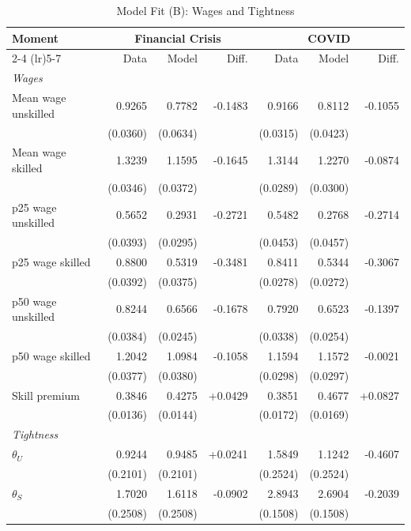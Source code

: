 \begin{table}[htbp]
  \centering
  \caption{Model Fit (B): Wages and Tightness}
  \label{tab:model_fit_b}
  \small
  \begin{tabular}{lrrrrrr}
    \toprule
    Moment & \multicolumn{3}{c}{Financial Crisis} & \multicolumn{3}{c}{COVID} \\
    \cmidrule(lr){2-4} \cmidrule(lr){5-7}
     & Data & Model & Diff. & Data & Model & Diff. \\
    \midrule
    \multicolumn{7}{l}{\textit{Wages}} \\[2pt]
    \quad Mean wage unskilled & 0.9265 & 0.7782 & -0.1483 & 0.9166 & 0.8112 & -0.1055 \\
     & {\scriptsize (0.0360)} & {\scriptsize (0.0634)} & & {\scriptsize (0.0315)} & {\scriptsize (0.0423)} & \\
    \quad Mean wage skilled & 1.3239 & 1.1595 & -0.1645 & 1.3144 & 1.2270 & -0.0874 \\
     & {\scriptsize (0.0346)} & {\scriptsize (0.0372)} & & {\scriptsize (0.0289)} & {\scriptsize (0.0300)} & \\
    \quad p25 wage unskilled & 0.5652 & 0.2931 & -0.2721 & 0.5482 & 0.2768 & -0.2714 \\
     & {\scriptsize (0.0393)} & {\scriptsize (0.0295)} & & {\scriptsize (0.0453)} & {\scriptsize (0.0457)} & \\
    \quad p25 wage skilled & 0.8800 & 0.5319 & -0.3481 & 0.8411 & 0.5344 & -0.3067 \\
     & {\scriptsize (0.0392)} & {\scriptsize (0.0375)} & & {\scriptsize (0.0278)} & {\scriptsize (0.0272)} & \\
    \quad p50 wage unskilled & 0.8244 & 0.6566 & -0.1678 & 0.7920 & 0.6523 & -0.1397 \\
     & {\scriptsize (0.0384)} & {\scriptsize (0.0245)} & & {\scriptsize (0.0338)} & {\scriptsize (0.0254)} & \\
    \quad p50 wage skilled & 1.2042 & 1.0984 & -0.1058 & 1.1594 & 1.1572 & -0.0021 \\
     & {\scriptsize (0.0377)} & {\scriptsize (0.0380)} & & {\scriptsize (0.0298)} & {\scriptsize (0.0297)} & \\
    \quad Skill premium & 0.3846 & 0.4275 & +0.0429 & 0.3851 & 0.4677 & +0.0827 \\
     & {\scriptsize (0.0136)} & {\scriptsize (0.0144)} & & {\scriptsize (0.0172)} & {\scriptsize (0.0169)} & \\
    [4pt]
    \multicolumn{7}{l}{\textit{Tightness}} \\[2pt]
    \quad $\theta_U$ & 0.9244 & 0.9485 & +0.0241 & 1.5849 & 1.1242 & -0.4607 \\
     & {\scriptsize (0.2101)} & {\scriptsize (0.2101)} & & {\scriptsize (0.2524)} & {\scriptsize (0.2524)} & \\
    \quad $\theta_S$ & 1.7020 & 1.6118 & -0.0902 & 2.8943 & 2.6904 & -0.2039 \\
     & {\scriptsize (0.2508)} & {\scriptsize (0.2508)} & & {\scriptsize (0.1508)} & {\scriptsize (0.1508)} & \\
    [4pt]
    \bottomrule
  \end{tabular}
\end{table}